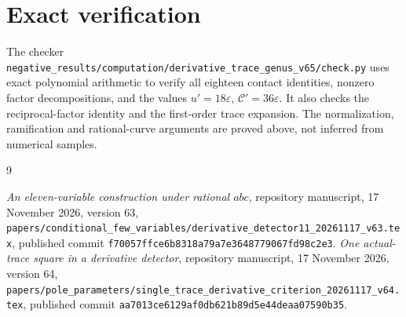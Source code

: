 \documentclass[11pt,a4paper]{article}
\begin{document}
\section{Exact verification}

The checker
\nolinkurl{negative_results/computation/derivative_trace_genus_v65/check.py}
uses exact polynomial arithmetic to verify all eighteen contact
identities, nonzero factor decompositions, and the values
$u'=18\varepsilon$, $\mathcal C'=36\varepsilon$.
It also checks the reciprocal-factor identity and the first-order
trace expansion. The normalization, ramification and rational-curve
arguments are proved above, not inferred from numerical samples.

\begin{thebibliography}{9}\raggedright
{}\emph{An eleven-variable construction under rational
$abc$}, repository manuscript, 17 November 2026, version 63,
\nolinkurl{papers/conditional_few_variables/derivative_detector11_20261117_v63.tex},
published commit
\nolinkurl{f70057ffce6b8318a79a7e3648779067fd98c2e3}.
\emph{One actual-trace square in a derivative detector},
repository manuscript, 17 November 2026, version 64,
\nolinkurl{papers/pole_parameters/single_trace_derivative_criterion_20261117_v64.tex},
published commit
\nolinkurl{aa7013ce6129af0db621b89d5e44deaa07590b35}.
\end{thebibliography}
\end{document}
